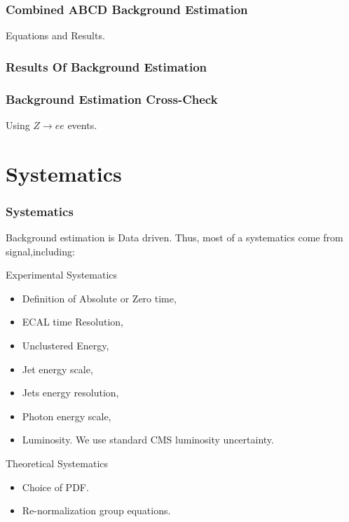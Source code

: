 \documentclass{beamer}
\begin{document}
\begin{frame}
\frametitle{Combined ABCD Background Estimation}
  Equations and Results.
 \begin{minipage}[t]{0.8\linewidth}

 \end{minipage}
 
 \begin{tcolorbox}[colback=UNL@Cream!5,colframe=UMN@Maroon!40,title=\textcolor{black}{\textbf{Closure Test Results: $0$,$1$-Jet Events}}]
 
 
 \end{tcolorbox}
 \begin{minipage}[t]{0.8\linewidth}

 \end{minipage}
\end{frame}

\begin{frame}
\frametitle{Results Of Background Estimation}

\end{frame}



\begin{frame}
\frametitle{Background Estimation Cross-Check}
Using $Z \rightarrow ee$ events.
\end{frame}





\section{Systematics}
\begin{frame}
\frametitle{\Huge Systematics}
 \begin{minipage}[t]{0.8\linewidth}
  Background estimation is Data driven.
  Thus, most of a systematics come from signal,including:
  \begin{varblock}[7cm]{Experimental Systematics}
   \begin{itemize}
    \item Definition of Absolute or Zero time,
    \item ECAL time Resolution,    
    \item Unclustered Energy,
    \item Jet energy scale,
    \item Jets energy resolution,
    \item Photon energy scale,
    \item Luminosity. We use standard CMS luminosity uncertainty.
   \end{itemize}
  \end{varblock}  
  \begin{varblock}[7cm]{Theoretical Systematics}
   \begin{itemize}   
   \item Choice of PDF.
   \item Re-normalization group equations.
   \end{itemize}
  \end{varblock} 
\end{minipage}
\end{frame}
\end{document}
